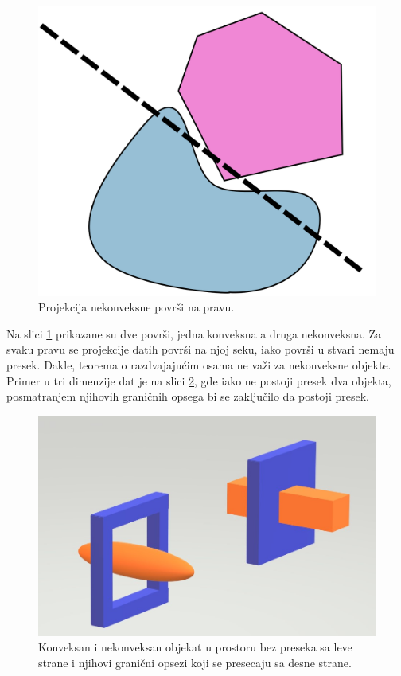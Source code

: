 \documentclass[12pt,oneside]{memoir}
\begin{document}
\begin{figure}[h!]
	\begin{center}
	\includegraphics[scale=0.17]{theorem_counterexample.png}
	\end{center}
	\caption{Projekcija nekonveksne površi na pravu.}
	\label{fig:counter}
\end{figure}

Na slici \ref{fig:counter} prikazane su dve površi, jedna konveksna a druga nekonveksna. 
Za svaku pravu se projekcije datih površi na njoj seku, iako površi u stvari nemaju presek.
 Dakle, teorema o razdvajajućim osama ne važi za nekonveksne objekte. 
Primer u tri dimenzije dat je na slici \ref{fig:falseCollision}, gde iako ne postoji presek dva objekta, 
posmatranjem njihovih graničnih opsega bi se zaključilo da postoji presek.

\begin{figure}[h!]
	\begin{center}
	\includegraphics[scale=0.5]{falseCollision.jpg}
	\end{center}
	
	\caption{Konveksan i nekonveksan objekat u prostoru bez preseka sa leve strane i
	njihovi granični opsezi koji se presecaju sa desne strane. }
	\label{fig:falseCollision}
\end{figure}
\end{document}
